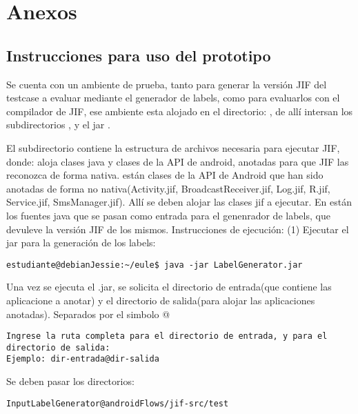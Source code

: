 \label{ch:anexos}
\chapter{Anexos}
\section{Instrucciones para uso del prototipo}
Se cuenta con un ambiente de prueba, tanto para generar la versión JIF del
testcase a evaluar mediante el generador de labels, como para evaluarlos con el
compilador de JIF, ese ambiente esta alojado en el directorio:
\textbf{\small{}}, de allí intersan los
subdirectorios \textbf{\small{}},
\textbf{\small{}} y el jar
\textbf{\small{}}.

El subdirectorio \textbf{\small{}} contiene la estructura
de archivos necesaria para ejecutar JIF, donde:
\textbf{\small{}} aloja clases java y clases de la API de
android, anotadas para que JIF las reconozca de forma nativa.\newline
\textbf{\small{}} están clases de la API de Android que
han sido anotadas de forma no nativa(Activity.jif, BroadcastReceiver.jif,
Log.jif, R.jif, Service.jif, SmsManager.jif). Allí se deben alojar las clases
jif a ejecutar.\newline
En {\small{}} están los fuentes java que se pasan
como entrada para el genenrador de labels, que devuleve la versión JIF de los
mismos.\newline
Instrucciones de ejecución:\newline
(1) Ejecutar el jar para la generación de los labels:
\begin{lstlisting}
estudiante@debianJessie:~/eule$ java -jar LabelGenerator.jar
\end{lstlisting}
Una vez se ejecuta el .jar, se solicita el directorio de entrada(que contiene
las aplicacione a anotar) y el directorio de salida(para alojar las
aplicaciones anotadas). Separados por el simbolo @
\begin{lstlisting}
Ingrese la ruta completa para el directorio de entrada, y para el 
directorio de salida:
Ejemplo: dir-entrada@dir-salida 
\end{lstlisting}
Se deben pasar los directorios:
\begin{lstlisting}
InputLabelGenerator@androidFlows/jif-src/test
\end{lstlisting}


